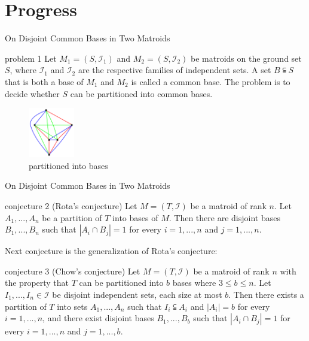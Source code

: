 \documentclass[11pt,xcolor=dvipsnames,table,dvipdfmx]{beamer}
\begin{document}
\section{Progress}
\begin{frame}{On Disjoint Common Bases in Two Matroids}
 \begin{alertblock}{problem 1}
  Let $M_1 = (S, \mathcal{I}_1)$ and $M_2 = (S, \mathcal{I}_2)$ be matroids on the ground set $S$, where $\mathcal{I}_1$ and $\mathcal{I}_2$ are the respective families of independent sets. A set $B \subseteqq S$ that is both a base of $M_1$ and $M_2$ is called a common base. The problem is to decide whether $S$ can be partitioned into common bases.
 \end{alertblock}
 \begin{figure}
  \centering
  \includegraphics[width=2cm]{partitioned-graph.png}
  \caption{partitioned into bases}
 \end{figure}
\end{frame}

\begin{frame}{On Disjoint Common Bases in Two Matroids}
 \begin{alertblock}{conjecture 2 (Rota's conjecture)}
  Let $M = (T, \mathcal{I})$ be a matroid of rank $n$. Let $A_1 , ..., A_n$ be a partition of $T$ into bases of $M$. Then there are disjoint bases $B_1 , ..., B_n$ such that $|A_i \cap B_j| = 1$ for every $i = 1, ..., n$ and $j = 1, ..., n$.
 \end{alertblock}
 Next conjecture is the generalization of Rota's conjecture:
 \begin{alertblock}{conjecture 3 (Chow's conjecture)}
  Let $M = (T, \mathcal{I})$ be a matroid of rank $n$ with the property that $T$ can be partitioned into $b$ bases where $3 \leq b \leq n$. Let $I_1, ..., I_n \in \mathcal{I}$ be disjoint independent sets, each size at most $b$. Then there exists a partition of $T$ into sets $A_1, ..., A_n$ such that $I_i \subseteqq A_i$ and $|A_i| = b$ for every $i = 1, ..., n$, and there exist disjoint bases $B_1, ..., B_b$ such that $|A_i \cap B_j| = 1$ for every $i = 1, ..., n$ and $j = 1, ..., b$.
 \end{alertblock}
\end{frame}
\end{document}
